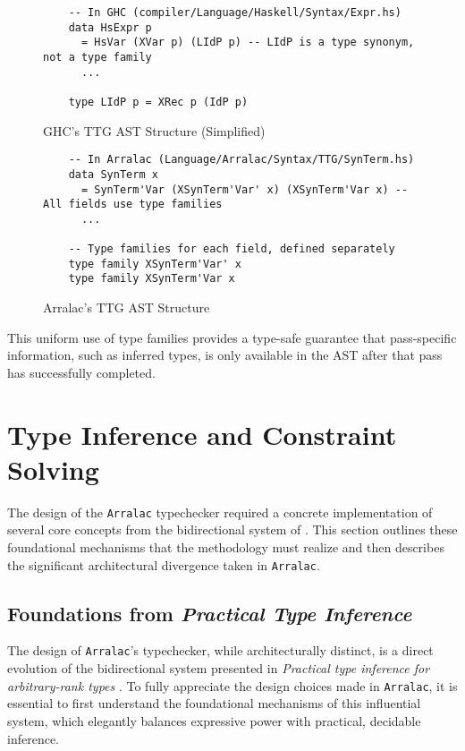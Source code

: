 \begin{figure}
    \centering
    \begin{verbatim}
    -- In GHC (compiler/Language/Haskell/Syntax/Expr.hs)
    data HsExpr p
      = HsVar (XVar p) (LIdP p) -- LIdP is a type synonym, not a type family
      ...
    
    type LIdP p = XRec p (IdP p)
    \end{verbatim}
    \caption{GHC's TTG AST Structure (Simplified)}
\end{figure}

\begin{figure}
    \centering
    \begin{verbatim}
    -- In Arralac (Language/Arralac/Syntax/TTG/SynTerm.hs)
    data SynTerm x
      = SynTerm'Var (XSynTerm'Var' x) (XSynTerm'Var x) -- All fields use type families
      ...
    
    -- Type families for each field, defined separately
    type family XSynTerm'Var' x
    type family XSynTerm'Var x
    \end{verbatim}
    \caption{Arralac's TTG AST Structure}
\end{figure}

This uniform use of type families provides a type-safe guarantee that pass-specific information, such as inferred types, is only available in the AST after that pass has successfully completed.

\section{Type Inference and Constraint Solving}
\label{sec:Design:TypeInference}

The design of the \texttt{Arralac} typechecker required a concrete implementation of several core concepts from the bidirectional system of \cite{jones-practical-2007}. This section outlines these foundational mechanisms that the methodology must realize and then describes the significant architectural divergence taken in \texttt{Arralac}.

\subsection{Foundations from \textit{Practical Type Inference}}
\label{sec:Design:Foundations}

The design of \texttt{Arralac}'s typechecker, while architecturally distinct, is a direct evolution of the bidirectional system presented in \textit{Practical type inference for arbitrary-rank types} \cite{jones-practical-2007}. To fully appreciate the design choices made in \texttt{Arralac}, it is essential to first understand the foundational mechanisms of this influential system, which elegantly balances expressive power with practical, decidable inference.

